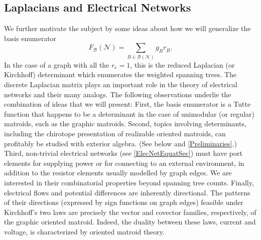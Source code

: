 \documentclass[12pt]{article}
\theoremstyle{definition}
\newcommand{\scomp}[1]{\ensuremath{\overline{#1}}}
\begin{document}
\subsection{Laplacians and Electrical Networks}
\label{IntroLaplace}

We further motivate the subject by some ideas 
about how we will generalize the basis enumerator
\begin{equation}
F_{\mathcal{B}}(\mathcal{N}) = 
\sum_{B\in\mathcal{B}(\mathcal{N})}g_Br_{\scomp{B}}.
\end{equation}
In the case of a graph with all the $r_e=1$, 
this is the reduced Laplacian 
(or Kirchhoff) determinant which enumerates the weighted spanning trees.
The discrete Laplacian matrix plays 
an important role in the theory of electrical networks and their
many analogs.  
The following observations underlie the combination of ideas
that we will present: First, the basis enumerator is a Tutte function that 
happens to be a determinant in the case of unimodular 
(or regular) matroids, such as the graphic matroids.
Second, topics involving determinants, including the
chirotope presentation of realizable oriented matroids,
can profitably be studied with exterior algebra.  
(See below and \textsection \ref{Preliminaries}.)  Third,
non-trivial electrical networks (see \textsection \ref{ElecNetEquatSec}) 
must have port elements 
for supplying power or for connecting to an external environment,
in addition to the resistor elements usually modelled by
graph edges.  We are interested in their combinatorial 
properties beyond spanning tree 
counts\cite{sdcMTT,sdcBDIMatroid,sdcELEW,sdcPorted,sdcISCAS95,sdcOMP,sdcISCAS98}.
Finally, electrical flows and potential differences
are inherently directional.  The patterns of their directions
(expressed by sign functions on graph edges)
feasible under Kirchhoff's two laws are precisely the 
vector and covector families, respectively, of the graphic 
oriented matroid.  Indeed, the duality between these laws, current
and voltage, is characterized by oriented matroid theory.
\end{document}
